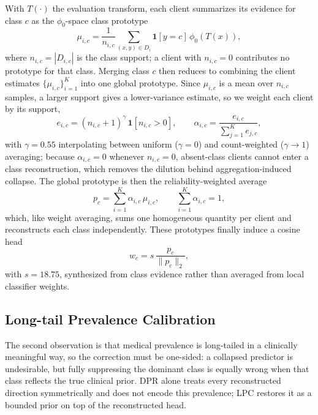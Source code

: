 \documentclass[letterpaper]{article} %
\begin{document}
With $T(\cdot)$ the evaluation transform, each client summarizes its evidence for class $c$ as the $\phi_0$-space class prototype
\begin{equation}
\mu_{i,c}=\frac{1}{n_{i,c}}\sum_{(x,y)\in D_i}\mathbf{1}[y=c]\,\phi_0(T(x)),
\end{equation}
where $n_{i,c}=|D_{i,c}|$ is the class support; a client with $n_{i,c}=0$ contributes no prototype for that class. Merging class $c$ then reduces to combining the client estimates $\{\mu_{i,c}\}_{i=1}^{K}$ into one global prototype. Since $\mu_{i,c}$ is a mean over $n_{i,c}$ samples, a larger support gives a lower-variance estimate, so we weight each client by its support,
\begin{equation}
e_{i,c}=(n_{i,c}+1)^{\gamma}\,\mathbf{1}[n_{i,c}>0],\qquad
\alpha_{i,c}=\frac{e_{i,c}}{\sum_{j=1}^{K} e_{j,c}},
\end{equation}
with $\gamma=0.55$ interpolating between uniform ($\gamma=0$) and count-weighted ($\gamma\!\to\!1$) averaging; because $\alpha_{i,c}=0$ whenever $n_{i,c}=0$, absent-class clients cannot enter a class reconstruction, which removes the dilution behind aggregation-induced collapse. The global prototype is then the reliability-weighted average
\begin{equation}
p_c=\sum_{i=1}^{K}\alpha_{i,c}\,\mu_{i,c},\qquad \sum_{i=1}^{K}\alpha_{i,c}=1,
\label{eq:dpr-fuse}
\end{equation}
which, like weight averaging, sums one homogeneous quantity per client and reconstructs each class independently. These prototypes finally induce a cosine head
\begin{equation}
w_c=s\,\frac{p_c}{\|p_c\|_2},
\end{equation}
with $s=18.75$, synthesized from class evidence rather than averaged from local classifier weights.

\subsection{Long-tail Prevalence Calibration}

The second observation is that medical prevalence is long-tailed in a clinically meaningful way, so the correction must be one-sided: a collapsed predictor is undesirable, but fully suppressing the dominant class is equally wrong when that class reflects the true clinical prior. DPR alone treats every reconstructed direction symmetrically and does not encode this prevalence; LPC restores it as a bounded prior on top of the reconstructed head.
\end{document}

